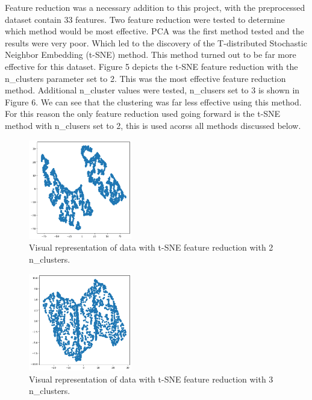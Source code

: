 \documentclass[twocolumn]{article}
\begin{document}
Feature reduction was a necessary addition to this project, with the preprocessed dataset contain 33 features. Two feature reduction were tested to determine which method would be most effective. PCA was the first method tested and the results were very poor. Which led to the discovery of the T-distributed Stochastic Neighbor Embedding (t-SNE) method. This method turned out to be far more effective for this dataset. Figure 5 depicts the t-SNE feature reduction with the n\_clusters parameter set to 2. This was the most effective feature reduction method. Additional n\_cluster values were tested, n\_clusers set to 3 is shown in Figure 6. We can see that the clustering was far less effective using this method. For this reason the only feature reduction used going forward is the t-SNE method with n\_clusers set to 2, this is used acorss all methods discussed below.

\begin{figure}
    \centering
    \includegraphics[width=0.4\textwidth]{images/tsne_2.png}
    \caption{Visual representation of data with t-SNE feature reduction with 2 n\_clusters.}
\end{figure}



\begin{figure}
    \centering
    \includegraphics[width=0.4\textwidth]{images/tsne_3.png}
    \caption{Visual representation of data with t-SNE feature reduction with 3 n\_clusters.}
\end{figure}
\end{document}
